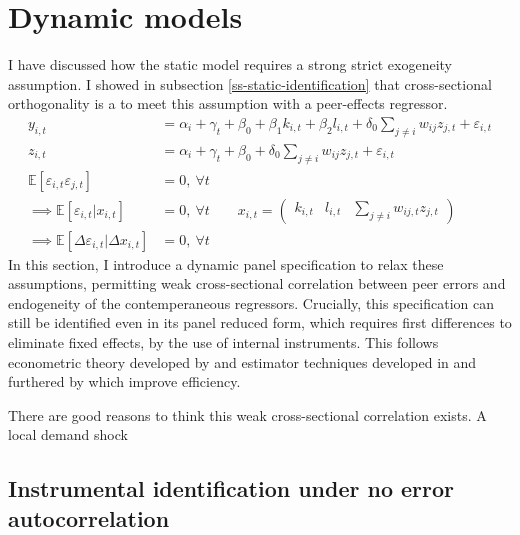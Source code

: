 \section{Dynamic models}
\label{s:model-dynamic-panel}

I have discussed how the static model requires a strong strict exogeneity assumption.
I showed in subsection \ref{ss-static-identification} that
cross-sectional orthogonality is a  to meet this assumption
with a peer-effects regressor.
\begin{align*}
    y_{i,t} &= \alpha_i + \gamma_t + \beta_0
                + \beta_1 k_{i,t}
                + \beta_2 l_{i,t}
                + \delta_0 \sum_{j\neq i} w_{ij}z_{j,t}
                + \varepsilon_{i,t}
    \\
    z_{i,t} &= \alpha_i + \gamma_t + \beta_0
                + \delta_0 \sum_{j\neq i} w_{ij}z_{j,t}
                + \varepsilon_{i,t}
    \\
    \mathbb E[\varepsilon_{i,t}\varepsilon_{j,t}] &= 0, \ \forall t
    \\
    \implies 
    \mathbb E[\varepsilon_{i,t}|x_{i,t}] &= 0, \ \forall t
    \qquad
    x_{i,t} =
    \begin{pmatrix}
        k_{i,t} &   l_{i,t} &   \sum_{j\neq i} w_{ij,t}z_{j,t}
    \end{pmatrix}
    \\
    \implies 
    \mathbb E[\Delta \varepsilon_{i,t}|\Delta x_{i,t}] &= 0, \ \forall t
\end{align*}
In this section, I introduce a dynamic panel specification to relax these assumptions,
permitting weak cross-sectional correlation between peer errors
and endogeneity of the contemperaneous regressors.
Crucially, this specification can still be identified even in its panel reduced form,
which requires first differences to eliminate fixed effects, by the use of internal instruments.
This follows econometric theory developed by \citep{Anderson1981} and estimator techniques
developed in \citep{Arellano1991} and furthered by \citep{Blundell1998} which improve efficiency.
\par
There are good reasons to think this weak cross-sectional correlation exists.
A local demand shock 

\subsection{Instrumental identification under no error autocorrelation}

